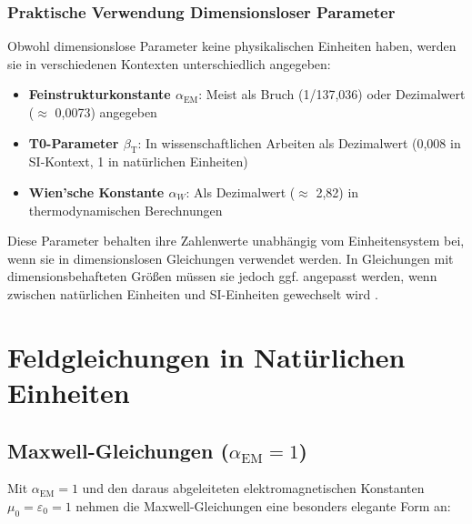 \documentclass[12pt,a4paper]{article}
\newcommand{\alphaEM}{\alpha_{\text{EM}}}
\newcommand{\betaT}{\beta_{\text{T}}}
\begin{document}
	\subsubsection{Praktische Verwendung Dimensionsloser Parameter}
	
	Obwohl dimensionslose Parameter keine physikalischen Einheiten haben, werden sie in verschiedenen Kontexten unterschiedlich angegeben:
	
	\begin{itemize}
		\item \textbf{Feinstrukturkonstante $\alphaEM$}: Meist als Bruch (1/137,036) oder Dezimalwert ($\approx$ 0,0073) angegeben
		\item \textbf{T0-Parameter $\betaT$}: In wissenschaftlichen Arbeiten als Dezimalwert (0,008 in SI-Kontext, 1 in natürlichen Einheiten)
		\item \textbf{Wien'sche Konstante $\alpha_W$}: Als Dezimalwert ($\approx$ 2,82) in thermodynamischen Berechnungen
	\end{itemize}
	
	Diese Parameter behalten ihre Zahlenwerte unabhängig vom Einheitensystem bei, wenn sie in dimensionslosen Gleichungen verwendet werden. In Gleichungen mit dimensionsbehafteten Größen müssen sie jedoch ggf. angepasst werden, wenn zwischen natürlichen Einheiten und SI-Einheiten gewechselt wird \cite{pascher_alpha_2025, pascher_beta_2025}.
	
	\section{Feldgleichungen in Natürlichen Einheiten}
	
	\subsection{Maxwell-Gleichungen ($\alphaEM = 1$)}
	
	Mit $\alphaEM = 1$ und den daraus abgeleiteten elektromagnetischen Konstanten $\mu_0 = \varepsilon_0 = 1$ nehmen die Maxwell-Gleichungen eine besonders elegante Form an:
	
\end{document}

